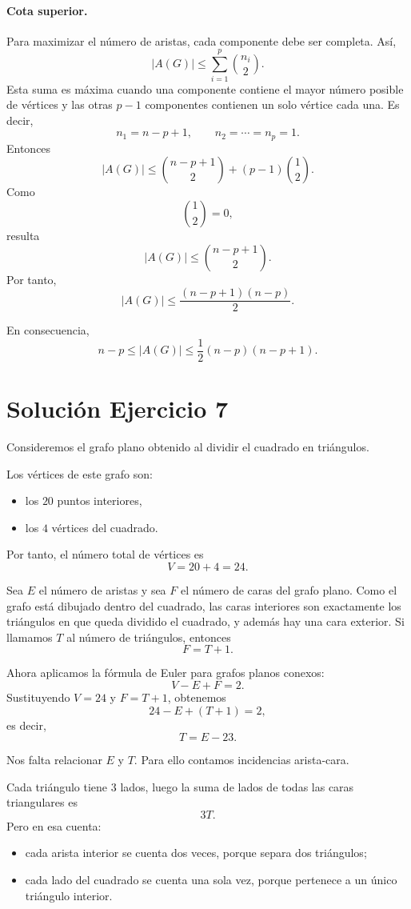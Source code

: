 \documentclass[12pt]{article}
\begin{document}
\begin{enumerate}
    \paragraph{Cota superior.}
    Para maximizar el número de aristas, cada componente debe ser completa. Así,
    \[
    |A(G)|\le \sum_{i=1}^p \binom{n_i}{2}.
    \]
    Esta suma es máxima cuando una componente contiene el mayor número posible de vértices y las otras \(p-1\) componentes contienen un solo vértice cada una. Es decir,
    \[
    n_1=n-p+1,\qquad n_2=\cdots=n_p=1.
    \]
    Entonces
    \[
    |A(G)|\le \binom{n-p+1}{2}+(p-1)\binom{1}{2}.
    \]
    Como
    \[
    \binom{1}{2}=0,
    \]
    resulta
    \[
    |A(G)|\le \binom{n-p+1}{2}.
    \]
    Por tanto,
    \[
    |A(G)|\le \frac{(n-p+1)(n-p)}{2}.
    \]

    En consecuencia,
    \[
    \boxed{n-p \le |A(G)| \le \frac{1}{2}(n-p)(n-p+1).}
    \]
\end{enumerate}

\section*{Solución Ejercicio 7}

Consideremos el grafo plano obtenido al dividir el cuadrado en triángulos.

\medskip

Los vértices de este grafo son:
\begin{itemize}
    \item los \(20\) puntos interiores,
    \item los \(4\) vértices del cuadrado.
\end{itemize}
Por tanto, el número total de vértices es
\[
V=20+4=24.
\]

Sea \(E\) el número de aristas y sea \(F\) el número de caras del grafo plano. Como el grafo está dibujado dentro del cuadrado, las caras interiores son exactamente los triángulos en que queda dividido el cuadrado, y además hay una cara exterior. Si llamamos \(T\) al número de triángulos, entonces
\[
F=T+1.
\]

Ahora aplicamos la fórmula de Euler para grafos planos conexos:
\[
V-E+F=2.
\]
Sustituyendo \(V=24\) y \(F=T+1\), obtenemos
\[
24-E+(T+1)=2,
\]
es decir,
\[
T=E-23.
\]

Nos falta relacionar \(E\) y \(T\). Para ello contamos incidencias arista-cara.

Cada triángulo tiene \(3\) lados, luego la suma de lados de todas las caras triangulares es
\[
3T.
\]
Pero en esa cuenta:
\begin{itemize}
    \item cada arista interior se cuenta dos veces, porque separa dos triángulos;
    \item cada lado del cuadrado se cuenta una sola vez, porque pertenece a un único triángulo interior.
\end{itemize}
\end{document}
